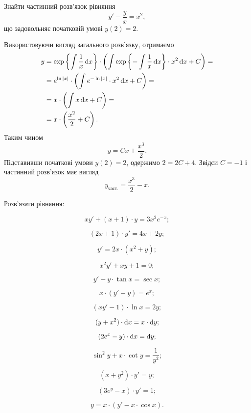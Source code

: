 \begin{example}
	Знайти частинний розв’язок рівняння \[ y' - \frac yx = x^2,\] що задовольняє початковій умові $y(2) = 2$.
\end{example}
\begin{solution}
	Використовуючи вигляд загального розв’язку, отримаємо
	\begin{align*}
		y &= \exp\left\{\int \frac1x \mathop{}\!\mathrm{d} x\right\} \cdot \left(\int \exp\left\{-\int\frac1x\mathop{}\!\mathrm{d} x\right\}\cdot x^2 \mathop{}\!\mathrm{d} x+C\right) = \\
		&= e^{\ln|x|} \cdot \left(\int e^{-\ln|x|} \cdot x^2 \mathop{}\!\mathrm{d} x+C\right) = \\
		&= x \cdot \left(\int x \mathop{}\!\mathrm{d} x+C\right) = \\
		&= x \cdot \left(\frac{x^2}{2} + C\right).
	\end{align*}
	Таким чином 
	\[ y = C x + \frac{x^3}{2}.\]
	Підставивши початкові умови $y(2) = 2$, одержимо $2 = 2C + 4$. Звідси $C = -1$ і частинний розв’язок має вигляд \[ y_{\text{част.}} = \frac{x^3}{2} - x.\]
\end{solution}

Розв’язати рівняння:
\begin{multicols}{2}
\begin{problem}
	\[x y' + (x + 1) \cdot y = 3 x^2 e^{-x};\]
\end{problem}
\begin{problem}
	\[(2x + 1) \cdot y' =4x+2y;\]
\end{problem}
\begin{problem}
	\[y'=2x\cdot(x^2+y);\]
\end{problem}
\begin{problem}
	\[x^2y'+xy+1=0;\]
\end{problem}
\begin{problem}
	\[y'+y\cdot\tan x=\sec x;\]
\end{problem}
\begin{problem}
	\[x\cdot(y'-y)=e^x;\]
\end{problem}
\begin{problem}
	\[(xy'-1)\cdot\ln x=2y;\]
\end{problem}
\begin{problem}
	\[(y+x^2)\cdot \mathop{}\!\mathrm{d} x=x \cdot\mathop{}\!\mathrm{d} y;\]
\end{problem}
\begin{problem}
	\[(2e^x-y)\cdot\mathop{}\!\mathrm{d} x=\mathop{}\!\mathrm{d} y;\]
\end{problem}
\begin{problem}
	\[\sin^2 y + x \cdot \cot y = \frac1{y^2};\]
\end{problem}
\begin{problem}
	\[(x+y^2)\cdot y'=y;\]
\end{problem}
\begin{problem}
	\[(3e^y-x)\cdot y' = 1;\]
\end{problem}
\begin{problem}
	\[y = x\cdot(y'- x \cdot \cos x).\]
\end{problem}
\end{multicols}

